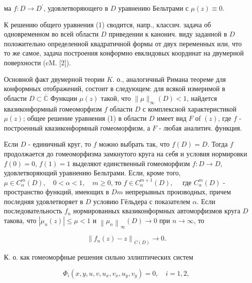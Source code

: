\documentclass[10pt]{article}
\begin{document}
ма $f: D \rightarrow D^{\prime}$, удовлетворяющего в $D$ уравнению Бельтрами с $\mu(z) \equiv 0$.



К решению общего уравнения (1) сводится, напр., классич. задача об одновременном во всей области $D$ приведении к канонич. виду заданной в $D$ положительно определенной квадратичной формы от двух переменных или, что то же самое, задача построения конформно евклидовых координат на двумерной поверхности (cM. [2]).



Основной факт двумерной теории $K$. о., аналогичный Римана теореме для конформных отображений, состоит в следующем: для всякой измеримой в области $D \subset \overline{\mathbb{C}}$ Функции $\mu(z)$ такой, что $\|\mu\|_{\infty}(D)<1$, найдется квазиконформный гомеоморфизм $f$ области $D$ с комплексной характеристикой $\mu(z)$; общее решение уравнения (1) в области $D$ имеет вид $F$ оf $(z)$, где $f$ - построенный квазиконформный гомеоморфизм, а $F$ - любая аналитич. функция.



Если $D$ - единичный круг, то $f$ можно выбрать так, что $f(D)=D$. Тогда $f$ продолжается до гомеоморфизма замкнутого круга на себя и условия нормировки $f(0)=0$, $f(1)=1$ выделяют единственный гомеоморфизм $f: D \rightarrow D$, удовлетворяющий уравнению Бельтрами. Если, кроме того, $\mu \in C_{\alpha}^{m}(D), \quad 0<\alpha<1, \quad m \geqslant 0$, то $f \in C_{\alpha}^{m+1}(D), \quad$ где $C_{\alpha}^{m}(D)$ - пространство функций, имеющих в $D m$ непрерывных производных, причем последняя удовлетворяет в $D$ условию Гёльдера с показателем $\alpha$. Если последовательность $f_{n}$ нормированных квазиконформных автоморфизмов круга $D$ такова, что $\left|\mu_{n}(z)\right| \leqslant \mu<1$ и $\left\|\mu_{n}\right\|_{\infty}(D) \rightarrow 0$ при $n \rightarrow \infty$, то



\[

\left\|f_{n}(z)-z\right\|_{C(D)} \longrightarrow 0 .

\]



К. о. как гомеоморфные решения сильно эллиптических систем



\[

\Phi_{i}\left(x, y, u, v, u_{x}, v_{x}, u_{y}, v_{y}\right)=0, \quad i=1,2,

\]
\end{document}
